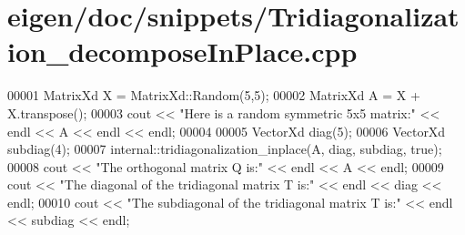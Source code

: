 \hypertarget{eigen_2doc_2snippets_2_tridiagonalization__decompose_in_place_8cpp_source}{}\section{eigen/doc/snippets/\+Tridiagonalization\+\_\+decompose\+In\+Place.cpp}
\label{eigen_2doc_2snippets_2_tridiagonalization__decompose_in_place_8cpp_source}

\begin{DoxyCode}
00001 MatrixXd X = MatrixXd::Random(5,5);
00002 MatrixXd A = X + X.transpose();
00003 cout << \textcolor{stringliteral}{"Here is a random symmetric 5x5 matrix:"} << endl << A << endl << endl;
00004 
00005 VectorXd diag(5);
00006 VectorXd subdiag(4);
00007 internal::tridiagonalization\_inplace(A, diag, subdiag, \textcolor{keyword}{true});
00008 cout << \textcolor{stringliteral}{"The orthogonal matrix Q is:"} << endl << A << endl;
00009 cout << \textcolor{stringliteral}{"The diagonal of the tridiagonal matrix T is:"} << endl << diag << endl;
00010 cout << \textcolor{stringliteral}{"The subdiagonal of the tridiagonal matrix T is:"} << endl << subdiag << endl;
\end{DoxyCode}
